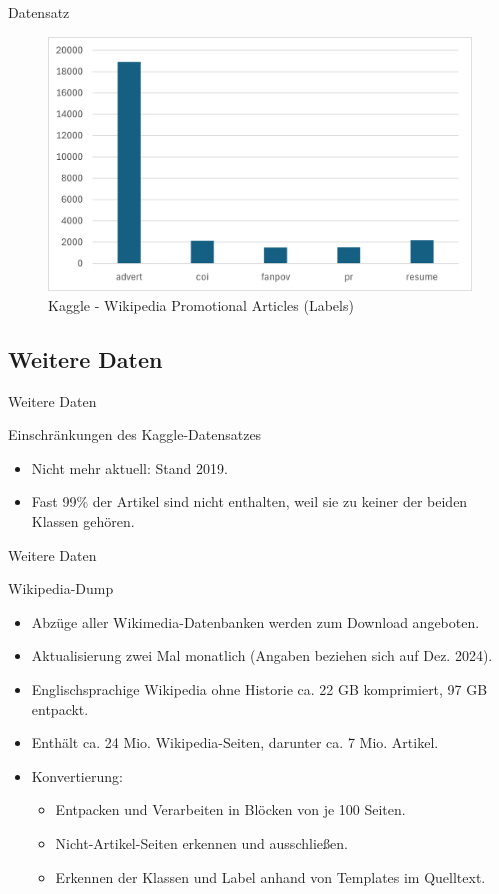 \documentclass[aspectratio=169]{beamer} %
\begin{document}
\begin{frame}{Datensatz}
    \begin{figure}
        \centering
        \includegraphics[width=0.6\linewidth]{figures/kaggle-promo-labels.png}
        \caption{Kaggle - Wikipedia Promotional Articles (Labels)}
    \end{figure}
\end{frame}

\subsection{Weitere Daten}

\begin{frame}{Weitere Daten}
    \begin{block}{Einschränkungen des Kaggle-Datensatzes}
        \begin{itemize}
            \item Nicht mehr aktuell: Stand 2019.
            \item Fast 99\% der Artikel sind nicht enthalten, weil sie zu keiner der beiden Klassen gehören.
        \end{itemize}
    \end{block}
\end{frame}

\begin{frame}{Weitere Daten}
    \begin{block}{Wikipedia-Dump}
        \begin{itemize}
            \item Abzüge aller Wikimedia-Datenbanken werden zum Download angeboten.
            \item Aktualisierung zwei Mal monatlich (Angaben beziehen sich auf Dez. 2024).
            \item Englischsprachige Wikipedia ohne Historie ca. 22 GB komprimiert, 97 GB entpackt.
            \item Enthält ca. 24 Mio. Wikipedia-Seiten, darunter ca. 7 Mio. Artikel.
            \item Konvertierung:
                  \begin{itemize}
                      \item Entpacken und Verarbeiten in Blöcken von je 100 Seiten.
                      \item Nicht-Artikel-Seiten erkennen und ausschließen.
                      \item Erkennen der Klassen und Label anhand von Templates im Quelltext.
                  \end{itemize}
        \end{itemize}
    \end{block}
\end{frame}
\end{document}
